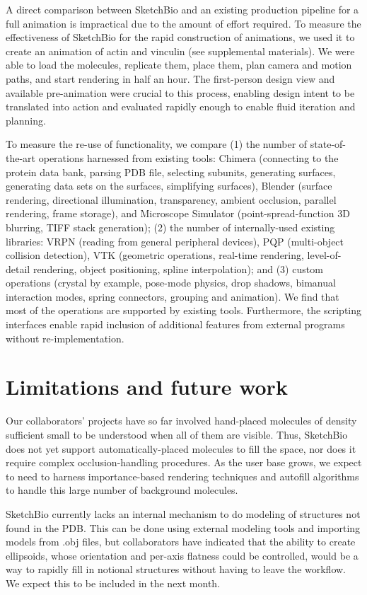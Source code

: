 \documentclass[twocolumn]{bmcart}%
\begin{document}
A direct comparison between SketchBio and an existing production pipeline for a full animation is impractical due to the amount of effort required.
To measure the effectiveness of SketchBio for the rapid construction of animations, we used it to create an animation of actin and vinculin (see supplemental materials).
We were able to load the molecules, replicate them, place them, plan camera and motion paths, and start rendering in half an hour.
The first-person design view and available pre-animation were crucial to this process, enabling design intent to be translated into action and evaluated rapidly enough to enable fluid iteration and planning.

To measure the re-use of functionality, we compare (1) the number of state-of-the-art operations harnessed from existing tools: Chimera (connecting to the protein data bank, parsing PDB file, selecting subunits, generating surfaces, generating data sets on the surfaces, simplifying surfaces), Blender (surface rendering, directional illumination, transparency, ambient occlusion, parallel rendering, frame storage), and Microscope Simulator (point-spread-function 3D blurring, TIFF stack generation); (2) the number of internally-used existing libraries: VRPN (reading from general peripheral devices), PQP (multi-object collision detection), VTK (geometric operations, real-time rendering, level-of-detail rendering, object positioning, spline interpolation); and (3) custom operations (crystal by example, pose-mode physics, drop shadows, bimanual interaction modes, spring connectors, grouping and animation).  We find that most of the operations are supported by existing tools.
Furthermore, the scripting interfaces enable rapid inclusion of additional features from external programs without re-implementation.


\section*{Limitations and future work}
Our collaborators' projects have so far involved hand-placed molecules of density sufficient small to be understood when all of them are visible.
Thus, SketchBio does not yet support automatically-placed molecules to fill the space, nor does it require complex occlusion-handling procedures.
As the user base grows, we expect to need to harness importance-based rendering techniques and autofill algorithms to handle this large number of background molecules.

SketchBio currently lacks an internal mechanism to do modeling of structures not found in the PDB.
This can be done using external modeling tools and importing models from .obj files, but collaborators have indicated that the ability to create ellipsoids, whose orientation and per-axis flatness could be controlled, would be a way to rapidly fill in notional structures without having to leave the workflow.
We expect this to be included in the next month.
\end{document}
